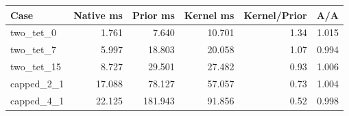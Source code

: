 \begin{tabular}{lrrrrr}
\toprule
Case & Native ms & Prior ms & Kernel ms & Kernel/Prior & A/A \\
\midrule
two\_tet\_0 & 1.761 & 7.640 & 10.701 & 1.34 & 1.015 \\
two\_tet\_7 & 5.997 & 18.803 & 20.058 & 1.07 & 0.994 \\
two\_tet\_15 & 8.727 & 29.501 & 27.482 & 0.93 & 1.006 \\
capped\_2\_1 & 17.088 & 78.127 & 57.057 & 0.73 & 1.004 \\
capped\_4\_1 & 22.125 & 181.943 & 91.856 & 0.52 & 0.998 \\
\bottomrule
\end{tabular}
